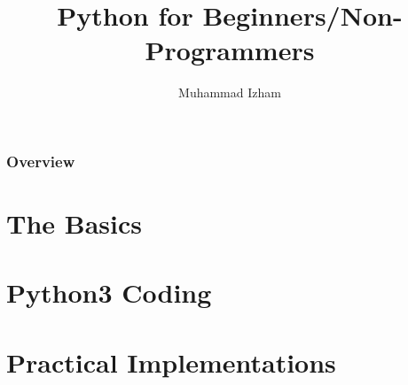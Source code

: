 \documentclass{beamer}
\title[PBNP]{Python for Beginners/Non-Programmers} %
\author{Muhammad Izham} %
\institute[Universiti Malaysia Perlis] %
{
Universiti Malaysia Perlis \\ %
\medskip
\textit{izham@unimap.edu.my} \\
\textit{sugita5019@gmail.com} \\ %


\textit{https://github.com/izham-sugita}
}
\date{} %
\begin{document}
\begin{frame}
\titlepage %
\end{frame}



\begin{frame}
\frametitle{Overview} %
\tableofcontents %
\end{frame}


\section{The Basics} 













\section{Python3 Coding}











\section{Practical Implementations}


%

\end{document}
